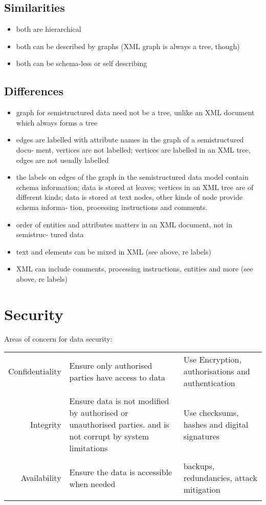 \documentclass[10pt]{article}
\begin{document}
        \subsection*{Similarities}
          \begin{itemize}
            \item both are hierarchical
            \item both can be described by graphs (XML graph is always a tree, though) 
            \item both can be schema-less or self describing
          \end{itemize}
        \subsection*{Differences}
          \begin{itemize}
            \item graph for semistructured data need not be a tree, unlike an XML document which always forms a tree
            \item edges are labelled with attribute names in the graph of a semistructured docu- ment, vertices are not labelled; vertices are labelled in an XML tree, edges are not usually labelled
            \item the labels on edges of the graph in the semistructured data model contain schema information; data is stored at leaves; vertices in an XML tree are of different kinds; data is stored at text nodes, other kinds of node provide schema informa- tion, processing instructions and comments.
            \item order of entities and attributes matters in an XML document, not in semistruc- tured data
            \item text and elements can be mixed in XML (see above, re labels)
            \item XML can include comments, processing instructions, entities and more (see above, re labels)
          \end{itemize}
          

  \section*{Security}
    Areas of concern for data security:\\
    \begin{tabular}{r | p{6cm} | p{6cm} } 
      Confidentiality & Ensure only authorised parties have access to data & Use Encryption, authorisations and authentication\\ & & \\
      Integrity & Ensure data is not modified by authorised or unauthorised parties. and is not corrupt by system limitations & Use checksums, hashes and digital signatures\\ & & \\
      Availability & Ensure the data is accessible when needed & backups, redundancies, attack mitigation\\ & & \\
    \end{tabular}
\end{document}
